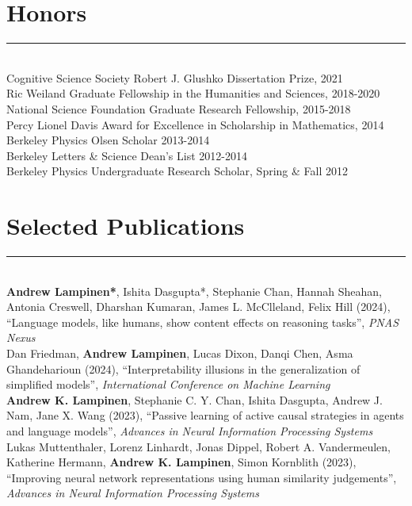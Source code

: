 \documentclass[margin]{res}
\begin{document}
\begin{resume}
\section{Honors} \vspace{-15pt} \rule{\textwidth}{0.5pt} \\[3pt]
Cognitive Science Society Robert J. Glushko Dissertation Prize, 2021 \\
Ric Weiland Graduate Fellowship in the Humanities and Sciences, 2018-2020 \\
National Science Foundation Graduate Research Fellowship, 2015-2018 \\
Percy Lionel Davis Award for Excellence in Scholarship in Mathematics, 2014 \\ 
Berkeley Physics Olsen Scholar 2013-2014 \\
Berkeley Letters \& Science Dean's List 2012-2014\\
Berkeley Physics Undergraduate Research Scholar, Spring \& Fall 2012
\vspace{1pt}\section{Selected Publications} \vspace{-15pt} \rule{\textwidth}{0.5pt} \\[3pt]
\textbf{Andrew Lampinen*}, Ishita Dasgupta*, Stephanie Chan, Hannah Sheahan, Antonia Creswell, Dharshan Kumaran, James L. McClleland, Felix Hill (2024), {``Language models, like humans, show content effects on reasoning tasks'', \textit{PNAS Nexus} \\[3pt] 
Dan Friedman, \textbf{Andrew Lampinen}, Lucas Dixon, Danqi Chen, Asma Ghandeharioun (2024), {``Interpretability illusions in the generalization of simplified models'',} \textit{International Conference on Machine Learning} \\[3pt]
\textbf{Andrew K. Lampinen}, Stephanie C. Y. Chan, Ishita Dasgupta, Andrew J. Nam, Jane X. Wang (2023), {``Passive learning of active causal strategies in agents and language models'',} \textit{Advances in Neural Information Processing Systems} \\[3pt]
Lukas Muttenthaler, Lorenz Linhardt, Jonas Dippel, Robert A. Vandermeulen, Katherine Hermann, \textbf{Andrew K. Lampinen}, Simon Kornblith (2023), {``Improving neural network representations using human similarity judgements'',} \textit{Advances in Neural Information Processing Systems} \\[3pt]
}
\end{resume}
\end{document}
